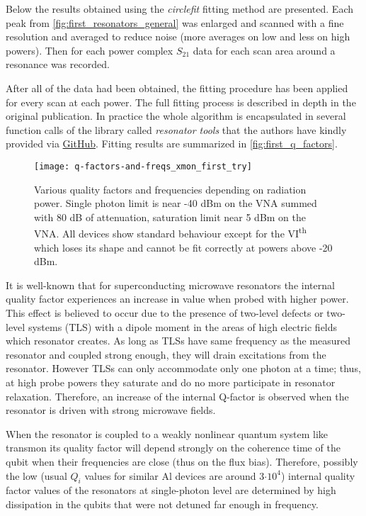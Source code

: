 Below the results obtained using the \textit{circlefit}\cite{probst2015} fitting method are presented. Each peak from \autoref{fig:first_resonators_general} was enlarged and scanned with a fine resolution and averaged to reduce noise (more averages on low and less on high powers). Then for each power complex $S_{21}$ data for each scan area around a resonance was recorded.

After all of the data had been obtained, the fitting procedure has been applied for every scan at each power. The full fitting process is described in depth in the original publication\cite{probst2015}. In practice the whole algorithm is encapsulated in several function calls of the library called \textit{resonator tools} that the authors have kindly provided via \href{https://github.com/sebastianprobst/resonatortools}{GitHub}. Fitting results are summarized in \autoref{fig:first_q_factors}.

\begin{figure}[t]
\centering
\texttt{[image: q-factors-and-freqs\_xmon\_first\_try]}
\caption{Various quality factors and frequencies depending on radiation power. Single photon limit is near -40 dBm on the VNA summed with 80 dB of attenuation, saturation limit near 5 dBm on the VNA. All devices show standard behaviour except for the VI\textsuperscript{th} which loses its shape and cannot be fit correctly at powers above -20 dBm.}
\label{fig:first_q_factors}
\end{figure}

It is well-known\cite{wang2009} that for superconducting microwave resonators the internal quality factor experiences an increase in value when probed with higher power. This effect is believed to occur due to the presence of two-level defects or two-level systems (TLS) with a dipole moment in the areas of high electric fields which resonator creates. As long as TLSs have same frequency as the measured resonator and coupled strong enough, they will drain excitations from the resonator. However TLSs can only accommodate only one photon at a time; thus, at high probe powers they saturate and do no more participate in resonator relaxation. Therefore, an increase of the internal Q-factor is observed when the resonator is driven with strong microwave fields.

When the resonator is coupled to a weakly nonlinear quantum system like transmon its quality factor will depend strongly on the coherence time of the qubit when their frequencies are close (thus on the flux bias). Therefore, possibly the low (usual $Q_i$ values for similar Al devices are around 3$\cdot 10^4$) internal quality factor values of the resonators at single-photon level are determined by high dissipation in the qubits that were not detuned far enough in frequency.

